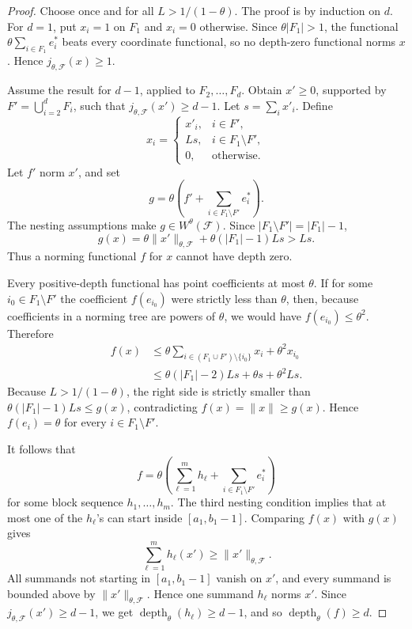 \documentclass[11pt]{article}
\newcommand{\cF}{\mathcal F}
\newcommand{\depth}{\operatorname{depth}}
\begin{document}
\begin{proof}
Choose once and for all \(L>1/(1-\theta)\).  The proof is by induction on
\(d\).  For \(d=1\), put \(x_i=1\) on \(F_1\) and \(x_i=0\) otherwise.
Since \(\theta |F_1|>1\), the functional
\(\theta\sum_{i\in F_1}e_i^*\) beats every coordinate functional, so no
depth-zero functional norms \(x\).  Hence \(j_{\theta,\cF}(x)\geq1\).

Assume the result for \(d-1\), applied to \(F_2,\ldots,F_d\).  Obtain
\(x'\geq0\), supported by \(F'=\bigcup_{i=2}^d F_i\), such that
\(j_{\theta,\cF}(x')\geq d-1\).  Let \(s=\sum_i x'_i\).  Define
\[
  x_i=\begin{cases}
    x'_i, & i\in F',\\
    Ls, & i\in F_1\setminus F',\\
    0, & \text{otherwise.}
  \end{cases}
\]
Let \(f'\) norm \(x'\), and set
\[
  g=\theta\left(f'+\sum_{i\in F_1\setminus F'}e_i^*\right).
\]
The nesting assumptions make \(g\in W^\theta(\cF)\).  Since
\(|F_1\setminus F'|=|F_1|-1\),
\[
  g(x)=\theta\|x'\|_{\theta,\cF}+
       \theta(|F_1|-1)Ls
       > Ls.
\]
Thus a norming functional \(f\) for \(x\) cannot have depth zero.

Every positive-depth functional has point coefficients at most \(\theta\).
If for some \(i_0\in F_1\setminus F'\) the coefficient \(f(e_{i_0})\) were
strictly less than \(\theta\), then, because coefficients in a norming tree are
powers of \(\theta\), we would have \(f(e_{i_0})\leq\theta^2\).  Therefore
\[
\begin{aligned}
  f(x)
  &\leq \theta\sum_{i\in (F_1\cup F')\setminus\{i_0\}}x_i
      +\theta^2 x_{i_0}  \\
  &\leq \theta(|F_1|-2)Ls+\theta s+\theta^2Ls.
\end{aligned}
\]
Because \(L>1/(1-\theta)\), the right side is strictly smaller than
\(\theta(|F_1|-1)Ls\leq g(x)\), contradicting \(f(x)=\|x\|\geq g(x)\).
Hence \(f(e_i)=\theta\) for every \(i\in F_1\setminus F'\).

It follows that
\[
  f=\theta\left(\sum_{\ell=1}^m h_\ell+
      \sum_{i\in F_1\setminus F'}e_i^*\right)
\]
for some block sequence \(h_1,\ldots,h_m\).  The third nesting condition
implies that at most one of the \(h_\ell\)'s can start inside
\([a_1,b_1-1]\).  Comparing \(f(x)\) with \(g(x)\) gives
\[
  \sum_{\ell=1}^m h_\ell(x')\geq \|x'\|_{\theta,\cF}.
\]
All summands not starting in \([a_1,b_1-1]\) vanish on \(x'\), and every
summand is bounded above by \(\|x'\|_{\theta,\cF}\).  Hence one summand
\(h_\ell\) norms \(x'\).  Since \(j_{\theta,\cF}(x')\geq d-1\), we get
\(\depth_\theta(h_\ell)\geq d-1\), and so \(\depth_\theta(f)\geq d\).
\end{proof}
\end{document}
